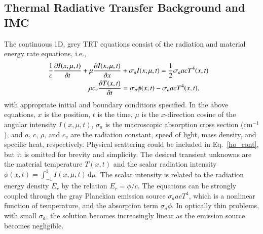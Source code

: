 \documentclass{anstrans}
\newcommand{\pderiv}[2]{\frac{\partial #1}{\partial #2}}
\renewcommand{\d}{\mathrm{d}}
\begin{document}
\subsection{Thermal Radiative Transfer Background and IMC}

The continuous 1D, grey TRT equations consist of the radiation and
material energy rate equations, i.e.,\vspace{-0.05in}
\begin{align}\label{ho_cont}
 \hspace{-0.12in}   \frac{1}{c}\pderiv{I(x,\mu,t)}{t} + \mu \pderiv{I(x,\mu,t)}{x} &+ \sigma_a
    I(x,\mu,t)
= \frac{1}{2} \sigma_a a c T^4(x,t)
    \\ \label{t_cont}
  \rho c_v \pderiv{T(x,t)}{t} &=  \sigma_a \phi(x,t) - \sigma_a a c T^4(x,t),
\end{align}
with appropriate initial and boundary conditions specified.
In the above equations, $x$ is the position, $t$ is the time, $\mu$ is
the $x$-direction cosine of the angular intensity $I(x,\mu,t)$, $\sigma_a$ is the
macroscopic absorption cross section (cm$^{-1}$), and $a$, $c$, $\rho$,
and
$c_v$ are the radiation constant, speed of light, mass density, and specific heat,
respectively.  Physical scattering could be included in Eq.~\eqref{ho_cont}, but it is omitted
for brevity and simplicity.  The desired transient unknowns are the material
temperature $T(x,t)$ and the scalar radiation intensity $\phi(x,t)=\int_{-1}^1
I(x,\mu,t)\, \d \mu$.  The scalar intensity is related to the radiation energy density
$E_r$ by the relation $E_r = \phi/c$.  The equations can be 
strongly coupled through the gray Planckian emission source $\sigma_a a c T^4$, which
is a nonlinear function of temperature, and the absorption
term $\sigma_a \phi$.  In optically thin problems, with small $\sigma_a$, the solution becomes
increasingly linear as the emission source becomes negligible.
\end{document}
